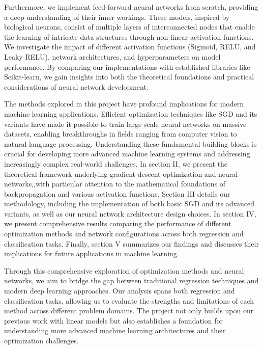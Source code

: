 \documentclass[aps,pra,english,notitlepage,reprint,nofootinbib]{revtex4-1}  %
\begin{document}
Furthermore, we implement feed-forward neural networks from scratch, providing a deep understanding of their inner workings. These models, inspired by biological neurons, consist of multiple layers of interconnected nodes that enable the learning of intricate data structures through non-linear activation functions. We investigate the impact of different activation functions (Sigmoid, RELU, and Leaky RELU), network architectures, and hyperparameters on model performance. By comparing our implementations with established libraries like Scikit-learn, we gain insights into both the theoretical foundations and practical considerations of neural network development.

The methods explored in this project have profound implications for modern machine learning applications. Efficient optimization techniques like SGD and its variants have made it possible to train large-scale neural networks on massive datasets, enabling breakthroughs in fields ranging from computer vision to natural language processing. Understanding these fundamental building blocks is crucial for developing more advanced machine learning systems and addressing increasingly complex real-world challenges. In section II, we present the theoretical framework underlying gradient descent optimization and neural networks,,with particular attention to the mathematical foundations of backpropagation and various activation functions. Section III details our methodology, including the implementation of both basic SGD and its advanced variants, as well as our neural network architecture design choices. In section IV, we present comprehensive results comparing the performance of different optimization methods and network configurations across both regression and classification tasks. Finally, section V summarizes our findings and discusses their implications for future applications in machine learning.

Through this comprehensive exploration of optimization methods and neural networks, we aim to bridge the gap between traditional regression techniques and modern deep learning approaches. Our analysis spans both regression and classification tasks, allowing us to evaluate the strengths and limitations of each method across different problem domains. The project not only builds upon our previous work with linear models but also establishes a foundation for understanding more advanced machine learning architectures and their optimization challenges.
\end{document}
